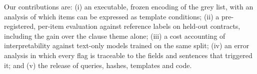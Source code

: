 Our contributions are: (i) an executable, frozen encoding of the grey list, with an analysis of which items can be expressed as template conditions; (ii) a pre-registered, per-item evaluation against reference labels on held-out contracts, including the gain over the clause theme alone; (iii) a cost accounting of interpretability against text-only models trained on the same split; (iv) an error analysis in which every flag is traceable to the fields and sentences that triggered it; and (v) the release of queries, hashes, templates and code.

